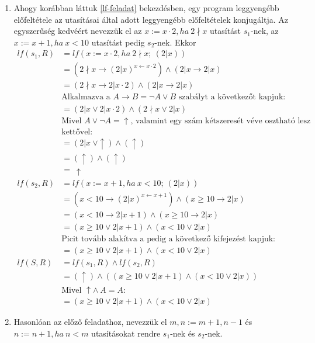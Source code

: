 \documentclass[12pt]{article}
\begin{document}
	\begin{enumerate}
		\item Ahogy korábban láttuk \ref{lf-feladat} bekezdésben, egy program leggyengébb előfeltétele az utasításai által adott leggyengébb előfeltételek konjugáltja. Az egyszerűség kedvéért nevezzük el az $x := x \cdot 2, ha\ 2 \nmid x$ utasítást $s_1$-nek, az $x := x + 1, ha\ x < 10$ utasítást pedig $s_2$-nek. Ekkor 
		\begin{align*}
		lf(s_1, R) &= lf(x := x \cdot 2, ha\ 2 \nmid x;\ (2 | x)) \\
		&= (2 \nmid x \rightarrow (2 | x)^{x \leftarrow x \cdot 2}) \land (2 | x \rightarrow 2 | x) \\
		&= (2 \nmid x \rightarrow 2 | x \cdot 2) \land (2 | x \rightarrow 2 | x) \\
		&\text{Alkalmazva a } A \rightarrow B = \neg A \lor B \text{ szabályt a következőt kapjuk:} \\
		&= (2 | x \lor 2 | x \cdot 2) \land (2 \nmid x \lor 2 | x) \\
		&\text{Mivel } A \lor \neg A = \uparrow \text{, valamint egy szám kétszeresét véve osztható lesz} \\
		&\text{kettővel:} \\
		&= (2 | x\ \lor \uparrow) \land (\uparrow) \\
		&= (\uparrow) \land (\uparrow) \\
		&=\ \uparrow \\
		lf(s_2, R) &= lf(x := x + 1, ha\ x < 10;\ (2 | x)) \\
		&= (x < 10 \rightarrow (2 | x)^{x \leftarrow x + 1}) \land (x \ge 10 \rightarrow 2 | x) \\
		&= (x < 10 \rightarrow 2 | x + 1) \land (x \ge 10 \rightarrow 2 | x) \\
		&= (x \ge 10 \lor 2 | x + 1) \land (x < 10 \lor 2 | x) \\
		&\text{Picit tovább alakítva a pedig a következő kifejezést kapjuk:} \\
		&= (x \ge 10 \lor 2 | x + 1) \land (x < 10 \lor 2 | x) \\
		lf(S, R) &= lf(s_1, R) \land lf(s_2, R) \\
		&= (\uparrow) \land ((x \ge 10 \lor 2 | x + 1) \land (x < 10 \lor 2 | x)) \\
		&\text{Mivel } \uparrow \land\ A = A: \\
		&= (x \ge 10 \lor 2 | x + 1) \land (x < 10 \lor 2 | x)
		\end{align*}
		\item Hasonlóan az előző feladathoz, nevezzük el $m,n := m+1, n-1$ és $n := n + 1, ha\ n < m$ utasításokat rendre $s_1$-nek és $s_2$-nek.

\end{enumerate}
\end{document}
